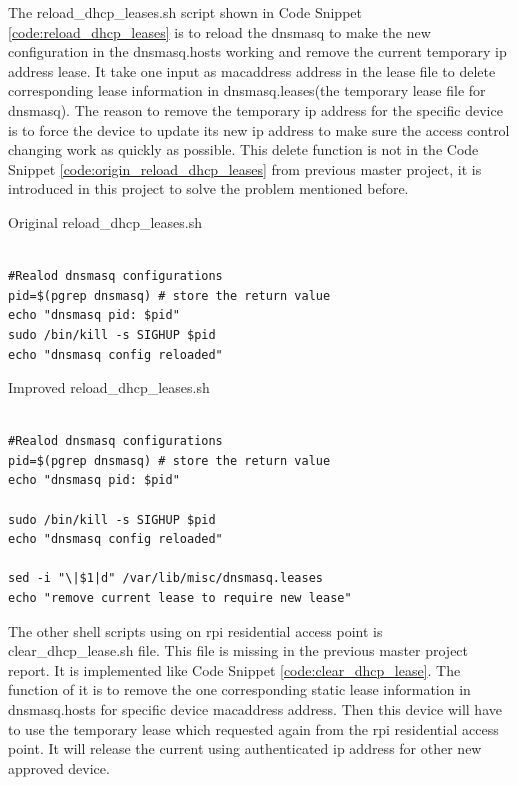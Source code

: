 \par The reload\_dhcp\_leases.sh script shown in Code Snippet \ref{code:reload_dhcp_leases} is to reload the dnsmasq to make the new configuration in the dnsmasq.hosts working and remove the current temporary \gls{ip} address lease. It take one input as \gls{macaddress} address in the lease file to delete corresponding lease information in dnsmasq.leases(the temporary lease file for dnsmasq). The reason to remove the temporary \gls{ip} address for the specific device is to force the device to update its new \gls{ip} address to make sure the access control changing work as quickly as possible. This delete function is not in the Code Snippet \ref{code:origin_reload_dhcp_leases} from previous master project, it is introduced in this project to solve the problem mentioned before.

\begin{algorithm}[h]
  \caption{Original reload\_dhcp\_leases.sh}
  \label{code:origin_reload_dhcp_leases}
  \begin{verbatim}
  
#Realod dnsmasq configurations
pid=$(pgrep dnsmasq) # store the return value
echo "dnsmasq pid: $pid"
sudo /bin/kill -s SIGHUP $pid
echo "dnsmasq config reloaded"
 \end{verbatim}
\end{algorithm}

\begin{algorithm}[h]
  \caption{Improved reload\_dhcp\_leases.sh}
  \label{code:reload_dhcp_leases}
  \begin{verbatim}
  
#Realod dnsmasq configurations
pid=$(pgrep dnsmasq) # store the return value
echo "dnsmasq pid: $pid"

sudo /bin/kill -s SIGHUP $pid
echo "dnsmasq config reloaded"

sed -i "\|$1|d" /var/lib/misc/dnsmasq.leases
echo "remove current lease to require new lease"
 \end{verbatim}
\end{algorithm}

\par The other shell scripts using on \gls{rpi} residential access point is clear\_dhcp\_lease.sh file. This file is missing in the previous master project report. It is implemented like Code Snippet \ref{code:clear_dhcp_lease}. The function of it is to remove the one corresponding static lease information in dnsmasq.hosts for specific device \gls{macaddress} address. Then this device will have to use the temporary lease which requested again from the \gls{rpi} residential access point. It will release the current using authenticated \gls{ip} address for other new approved device.

